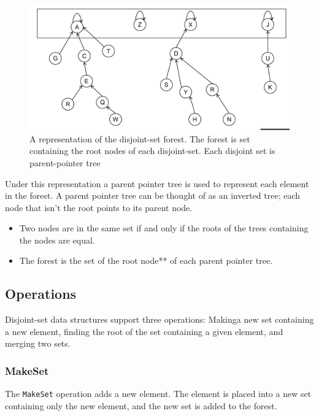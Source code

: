 \documentclass[
]{book}
\providecommand{\tightlist}{%
  \setlength{\itemsep}{0pt}\setlength{\parskip}{0pt}}
\begin{document}
\begin{figure}

{\centering \includegraphics{img/07-image03} 

}

\caption{A representation of the disjoint-set forest. The forest is set containing the root nodes of each disjoint-set. Each disjoint set is parent-pointer tree}\label{fig:disjoint-set}
\end{figure}

Under this representation a {parent pointer tree} is used to represent each element in the forest. A parent pointer tree can be thought of as an inverted tree; each node that isn't the root points to its parent node.

\begin{itemize}
\tightlist
\item
  Two nodes are in the same set if and only if the roots of the trees containing the nodes are equal.
\item
  The forest is the set of the {root node}** of each parent pointer tree.
\end{itemize}

\hypertarget{operations}{%
\subsection{Operations}\label{operations}}

Disjoint-set data structures support three operations: {Making}a new set containing a new element, {finding} the root of the set containing a given element, and {merging} two sets.

\hypertarget{makeset}{%
\subsubsection{MakeSet}\label{makeset}}

The \texttt{MakeSet} operation adds a new element. The element is placed into a new set containing only the new element, and the new set is added to the forest.
\end{document}
